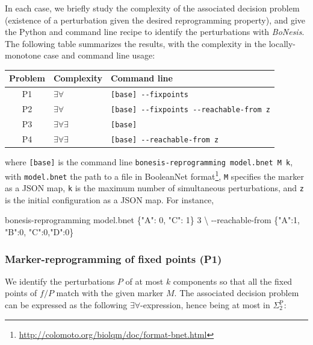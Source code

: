 \documentclass[PCJ,Unicode,screen,mode=plain]{cedram}
\newenvironment{Shaded}{}{}
\newcommand{\DataTypeTok}[1]{\textcolor[rgb]{0.56,0.13,0.00}{{#1}}}
\newcommand{\StringTok}[1]{\textcolor[rgb]{0.25,0.44,0.63}{{#1}}}
\newcommand{\NormalTok}[1]{{#1}}
\newcommand{\ExtensionTok}[1]{{#1}}
\newcommand{\AttributeTok}[1]{\textcolor[rgb]{0.49,0.56,0.16}{{#1}}}
\begin{document}
In each case, we briefly study the complexity of the associated decision
problem (existence of a perturbation given the desired reprogramming
property), and give the Python and command line recipe to identify the
perturbations with \emph{BoNesis}. The following table summarizes the
results, with the complexity in the locally-monotone case and command
line usage:

\begin{longtable}[]{@{}cll@{}}
\toprule()
Problem & Complexity & Command line \\
\midrule()
\endhead
P1 & \(\exists\forall\) & \texttt{{[}base{]}\ -\/-fixpoints} \\
P2 & \(\exists\forall\) &
\texttt{{[}base{]}\ -\/-fixpoints\ -\/-reachable-from\ z} \\
P3 & \(\exists\forall\exists\) & \texttt{{[}base{]}} \\
P4 & \(\exists\forall\exists\) &
\texttt{{[}base{]}\ -\/-reachable-from\ z} \\
\bottomrule()
\end{longtable}

where \texttt{{[}base{]}} is the command line
\texttt{bonesis-reprogramming\ model.bnet\ M\ k}, with
\texttt{model.bnet} the path to a file in
BooleanNet
format\footnote{\url{http://colomoto.org/biolqm/doc/format-bnet.html}}, \texttt{M} specifies the marker as a JSON map, \texttt{k} is
the maximum number of simultaneous perturbations, and \texttt{z} is the
initial configuration as a JSON map. For instance,

\begin{Shaded}
\begin{Highlighting}[]
\ExtensionTok{bonesis{-}reprogramming}\NormalTok{ model.bnet }\StringTok{\textquotesingle{}\{"A": 0, "C": 1\}\textquotesingle{}}\NormalTok{ 3 }\DataTypeTok{\textbackslash{}}
        \AttributeTok{{-}{-}reachable{-}from} \StringTok{\textquotesingle{}\{"A":1, "B":0, "C":0,"D":0\}\textquotesingle{}}
\end{Highlighting}
\end{Shaded}
\hypertarget{marker-reprogramming-of-fixed-points-p1}{%
\subsubsection{Marker-reprogramming of fixed points
(P1)}\label{marker-reprogramming-of-fixed-points-p1}}

We identify the perturbations \(P\) of at most \(k\) components so that
all the fixed points of \(f/P\) match with the given marker \(M\). The
associated decision problem can be expressed as the following
\(\exists\forall\)-expression, hence being at most in
\(\Sigma_2^{\mathrm P}\):
\end{document}
